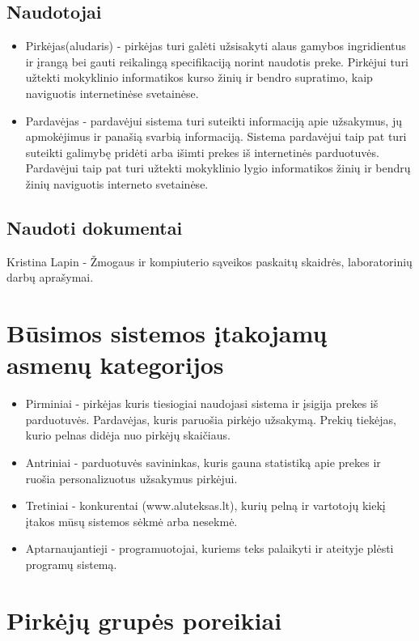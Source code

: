 \documentclass[oneside]{VUMIFPSkursinis}
\begin{document}
	\subsection{Naudotojai}
		\begin{itemize}
			\item{Pirkėjas(aludaris) - pirkėjas turi galėti užsisakyti alaus gamybos ingridientus ir įrangą bei gauti reikalingą specifikaciją norint naudotis preke.
				Pirkėjui turi užtekti mokyklinio informatikos kurso žinių ir bendro supratimo, kaip naviguotis internetinėse svetainėse.}
			\item{Pardavėjas - pardavėjui sistema turi suteikti informaciją apie užsakymus, jų apmokėjimus ir panašią svarbią informaciją.
				Sistema pardavėjui taip pat turi suteikti galimybę pridėti arba išimti prekes iš internetinės parduotuvės.
				Pardavėjui taip pat turi užtekti mokyklinio lygio informatikos žinių ir bendrų žinių naviguotis interneto svetainėse.}
		\end{itemize}
	\subsection{Naudoti dokumentai}
		Kristina Lapin - Žmogaus ir kompiuterio sąveikos paskaitų skaidrės, laboratorinių darbų aprašymai.

\section{Būsimos sistemos įtakojamų asmenų kategorijos}
\begin{itemize}
			\item{Pirminiai - pirkėjas kuris tiesiogiai naudojasi sistema ir įsigija prekes iš parduotuvės. 
				Pardavėjas, kuris paruošia pirkėjo užsakymą. 
				Prekių tiekėjas, kurio pelnas didėja nuo pirkėjų skaičiaus.}
			\item{Antriniai - parduotuvės savininkas, kuris gauna statistiką apie prekes ir ruošia personalizuotus užsakymus pirkėjui.}
			\item{Tretiniai - konkurentai (www.aluteksas.lt), kurių pelną ir vartotojų kiekį įtakos mūsų sistemos sėkmė arba nesekmė. }
			\item{Aptarnaujantieji - programuotojai, kuriems teks palaikyti ir ateityje plėsti programų sistemą.}
		\end{itemize}

\section{Pirkėjų grupės poreikiai}
\end{document}
